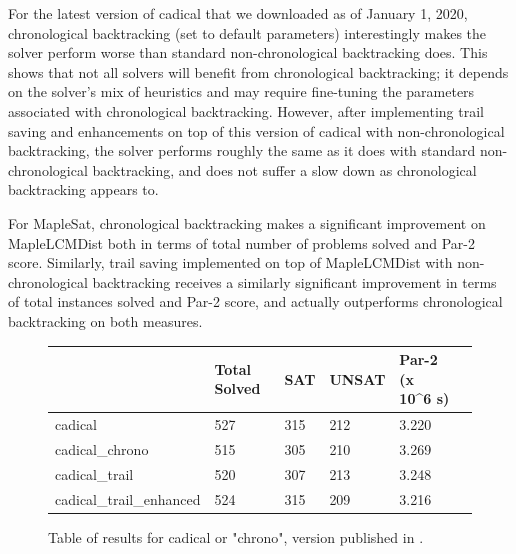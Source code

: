 \documentclass[runningheads]{llncs}
\begin{document}
For the latest version of cadical that we downloaded as of January 1,
2020, chronological backtracking (set to default parameters)
interestingly makes the solver perform worse than standard
non-chronological backtracking does. This shows that not all solvers
will benefit from chronological backtracking; it depends on the solver's
mix of heuristics and may require fine-tuning the parameters associated
with chronological backtracking. However, after implementing trail
saving and enhancements on top of this version of cadical with
non-chronological backtracking, the solver performs roughly the same as
it does with standard non-chronological backtracking, and does not
suffer a slow down as chronological backtracking appears to.

For MapleSat, chronological backtracking makes a significant improvement
on MapleLCMDist both in terms of total number of problems solved and
Par-2 score. Similarly, trail saving implemented on top of MapleLCMDist
with non-chronological backtracking receives a similarly significant
improvement in terms of total instances solved and Par-2 score, and
actually outperforms chronological backtracking on both measures.

\begin{figure}
    \begin{tabular}{|l|l|l|l|l|l|}
      \hline
      & Total Solved & SAT & UNSAT & Par-2 (x 10\textasciicircum{}6 s) \\ \hline
      cadical                  & 527          & 315 &  212  & 3.220                             \\ \hline
      cadical\_chrono          & 515          & 305 &  210  & 3.269                             \\ \hline
      cadical\_trail           & 520          & 307 &  213  & 3.248                             \\ \hline
      cadical\_trail\_enhanced & 524          & 315 &  209  & 3.216                             \\ \hline
    \end{tabular}
    \caption{Table of results for cadical or "chrono", version published in \cite{DBLP:conf/sat/MohleB19}.}
\end{figure}
\end{document}
